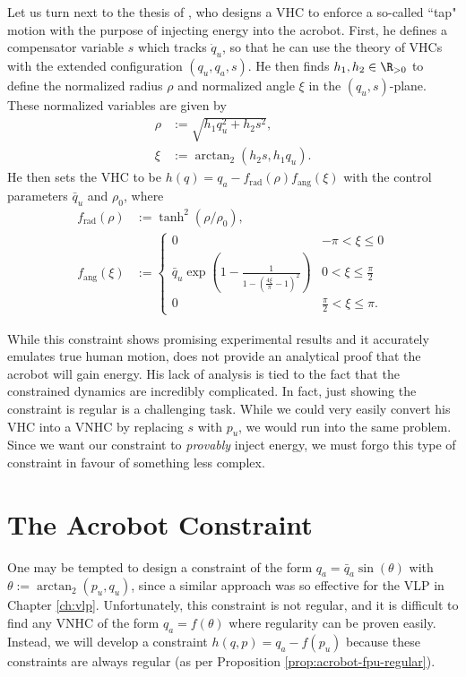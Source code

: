 Let us turn next to the thesis of \citet{xingbo_thesis}, who designs a VHC to enforce a
so-called ``tap" motion with the purpose of injecting energy into the acrobot. 
First, he defines a compensator variable \(s\) which tracks \(\dot{q}_u\), so
that he can use the theory of VHCs with the extended configuration 
\((q_u,q_a,s)\).
He then finds \(h_1, h_2 \in \R_{>0}\) to define the
normalized radius \(\rho\) and normalized angle \(\xi\) in the
\((q_u, s)\)-plane.
These normalized variables are given by
\begin{align*}
    \rho &:= \sqrt{h_1 q_u^2 + h_2 s^2}
    , \\
    \xi &:= \arctan_2(h_2 s, h_1 q_u)
    . 
\end{align*}
He then sets the VHC to be \(h(q) = q_a - f_\text{rad}(\rho)f_\text{ang}(\xi)\)
with the control parameters \(\bar{q}_u\) and \(\rho_0\), where
\begin{align}
    \label{eqn:xingbo-frad}
    f_\text{rad}(\rho) &:= \tanh^2(\rho/\rho_0)
    , \\
    \label{eqn:xingbo-fang}
    f_\text{ang}(\xi) &:= 
    \begin{cases}
        0 & -\pi < \xi \leq 0 \\
        \bar{q}_u \exp\left(1 - \frac{1}{1-(\frac{4\xi}{\pi} - 1)^2}\right) 
          & 0 < \xi \leq \frac{\pi}{2} \\
        0 & \frac{\pi}{2} < \xi \leq \pi
        .
    \end{cases}
\end{align}

While this constraint shows promising experimental results and it accurately
emulates true human motion, \citeauthor{xingbo_thesis}
does not provide an analytical proof that the acrobot will gain energy.
His lack of analysis is tied to the fact that the constrained
dynamics are incredibly complicated.
In fact, just showing the constraint is regular is a challenging task.
While we could very easily convert his VHC into a VNHC by replacing \(s\) with
\(p_u\), we would run into the same problem. 
Since we want our constraint to \textit{provably} inject energy, we must forgo
this type of constraint in favour of something less complex.

\section{The Acrobot Constraint}
One may be tempted to design a constraint of the form \(q_a = \bar{q}_a\sin(\theta)\) 
with \(\theta := \arctan_2(p_u,q_u)\), since a similar approach 
was so effective for the VLP in Chapter \ref{ch:vlp}.
Unfortunately, this constraint is not regular, and it is difficult to find any
VNHC of the form \(q_a = f(\theta)\) where regularity can be proven easily.
Instead, we will develop a constraint \(h(q,p) = q_a - f(p_u)\) because these
constraints are always regular (as per Proposition \ref{prop:acrobot-fpu-regular}). 
 
